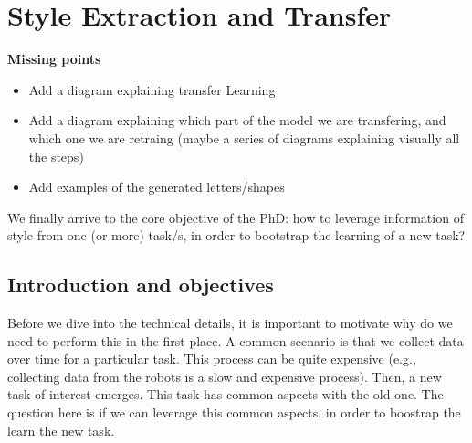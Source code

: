 \chapter{Style Extraction and Transfer}
\minitoc%

\textbf{Missing points}
\begin{itemize}
  \item Add a diagram explaining transfer Learning
  \item Add a diagram explaining which part of the model we are transfering, and which one we are retraing (maybe a series of diagrams explaining visually all the steps)
  \item Add examples of the generated letters/shapes
\end{itemize}

\par We finally arrive to the core objective of the PhD: how to leverage information of style from one (or more) \Gls{task}/s, in order to bootstrap the learning of a new task?

\clearpage

\section{Introduction and objectives}

  \par Before we dive into the technical details, it is important to motivate why do we need to perform this in the first place. A common scenario is that we collect data over time for a particular task. This process can be quite expensive (e.g., collecting data from the robots is a slow and expensive process). Then, a new task of interest emerges. This task has common aspects with the old one. The question here is if we can leverage this common aspects, in order to boostrap the learn the new task.


